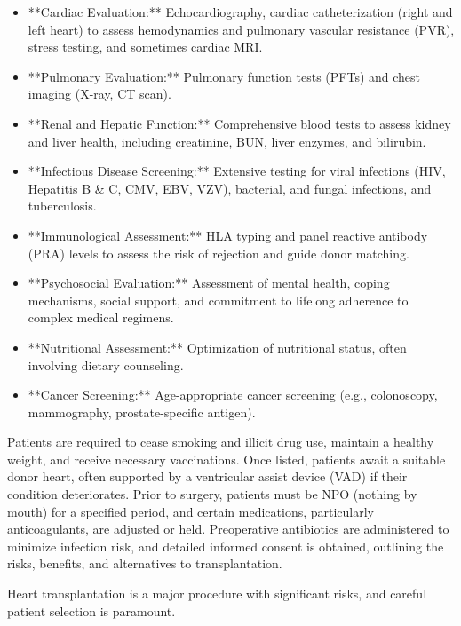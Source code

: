 \begin{itemize}
  \item **Cardiac Evaluation:** Echocardiography, cardiac catheterization (right and left heart) to assess hemodynamics and pulmonary vascular resistance (PVR), stress testing, and sometimes cardiac MRI.
  
  \item **Pulmonary Evaluation:** Pulmonary function tests (PFTs) and chest imaging (X-ray, CT scan).
  
  \item **Renal and Hepatic Function:** Comprehensive blood tests to assess kidney and liver health, including creatinine, BUN, liver enzymes, and bilirubin.
  
  \item **Infectious Disease Screening:** Extensive testing for viral infections (HIV, Hepatitis B \& C, CMV, EBV, VZV), bacterial, and fungal infections, and tuberculosis.
  
  \item **Immunological Assessment:** HLA typing and panel reactive antibody (PRA) levels to assess the risk of rejection and guide donor matching.
  
  \item **Psychosocial Evaluation:** Assessment of mental health, coping mechanisms, social support, and commitment to lifelong adherence to complex medical regimens.
  
  \item **Nutritional Assessment:** Optimization of nutritional status, often involving dietary counseling.
  
  \item **Cancer Screening:** Age-appropriate cancer screening (e.g., colonoscopy, mammography, prostate-specific antigen).
\end{itemize}

Patients are required to cease smoking and illicit drug use, maintain a healthy weight, and receive necessary vaccinations. Once listed, patients await a suitable donor heart, often supported by a ventricular assist device (VAD) if their condition deteriorates. Prior to surgery, patients must be NPO (nothing by mouth) for a specified period, and certain medications, particularly anticoagulants, are adjusted or held. Preoperative antibiotics are administered to minimize infection risk, and detailed informed consent is obtained, outlining the risks, benefits, and alternatives to transplantation.

Heart transplantation is a major procedure with significant risks, and careful patient selection is paramount.

